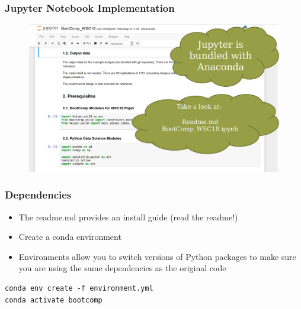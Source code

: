 \documentclass[aspectratio=169]{beamer}
\begin{document}
\begin{frame}
\frametitle{Jupyter Notebook Implementation}
\begin{figure}
\includegraphics[width=1.0\linewidth]{jupyter2.png}
\end{figure}
\end{frame}


\begin{frame}[fragile]
\frametitle{Dependencies}
\begin{itemize}
\item The readme.md provides an install guide (read the readme!)
\item Create a conda environment 
\item Environments allow you to switch versions of Python packages to make sure you are using the same dependencies as the original code
\end{itemize}

\begin{verbatim}
conda env create -f environment.yml
conda activate bootcomp
\end{verbatim}

\end{frame}

\end{document}
